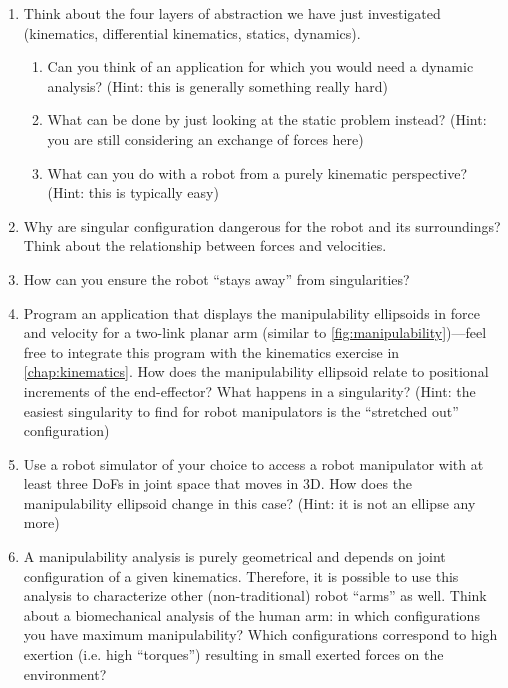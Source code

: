 \begin{enumerate}
\item Think about the four layers of abstraction we have just investigated (kinematics, differential kinematics, statics, dynamics).
\begin{enumerate}
\item Can you think of an application for which you would need a dynamic analysis? (Hint: this is generally something really hard)
\item What can be done by just looking at the static problem instead? (Hint: you are still considering an exchange of forces here)
\item What can you do with a robot from a purely kinematic perspective? (Hint: this is typically easy)
\end{enumerate}
\item Why are singular configuration dangerous for the robot and its surroundings? Think about the relationship between forces and velocities.
\item How can you ensure the robot ``stays away'' from singularities?
\item Program an application that displays the manipulability ellipsoids in force and velocity for a two-link planar arm (similar to \cref{fig:manipulability})---feel free to integrate this program with the kinematics exercise in \cref{chap:kinematics}. How does the manipulability ellipsoid relate to positional increments of the end-effector? What happens in a singularity? (Hint: the easiest singularity to find for robot manipulators is the ``stretched out'' configuration)
\item Use a robot simulator of your choice to access a robot manipulator with at least three DoFs in joint space that moves in 3D. How does the manipulability ellipsoid change in this case? (Hint: it is not an ellipse any more)
\item A manipulability analysis is purely geometrical and depends on joint configuration of a given kinematics. Therefore, it is possible to use this analysis to characterize other (non-traditional) robot ``arms'' as well. Think about a biomechanical analysis of the human arm: in which configurations you have maximum manipulability? Which configurations correspond to high exertion (i.e. high ``torques'') resulting in small exerted forces on the environment?
\end{enumerate}
